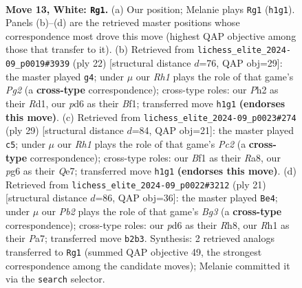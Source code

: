 \documentclass[11pt]{article}
\begin{document}
\clearpage

\begin{figure}[p]\centering
\begin{subfigure}{0.46\textwidth}\centering
\resizebox{\linewidth}{!}{%
\newchessgame
\chessboard[
  setfen={rnb1k2r/ppq1p1bp/3p2p1/4p1Pn/4P3/2N1BQ2/PPP2P1P/2KR1B1R w kq - 1 13},
  showmover=false,
  pgfstyle=straightmove, color=movearrow, markmove={h1-g1}
]}
\caption{}
\end{subfigure}\hfill
\begin{subfigure}{0.46\textwidth}\centering
\resizebox{\linewidth}{!}{%
\newchessgame
\chessboard[
  setfen={r1b1kb1r/2q2pp1/p1p2n2/1p2p2p/4P3/2N1BQ1P/PPP2PP1/2KR1BR1 w kq - 0 12},
  showmover=false,
  pgfstyle=straightmove, color=movearrow, markmove={g2-g4}
]}
\caption{}
\end{subfigure}
\\[4pt]
\begin{subfigure}{0.46\textwidth}\centering
\resizebox{\linewidth}{!}{%
\newchessgame
\chessboard[
  setfen={r4rk1/2pbqpb1/p4npp/1p2p3/4P3/1NP2Q1P/PPB2PP1/R1B1R1K1 b - - 3 15},
  showmover=false,
  pgfstyle=straightmove, color=movearrow, markmove={c7-c5}
]}
\caption{}
\end{subfigure}\hfill
\begin{subfigure}{0.46\textwidth}\centering
\resizebox{\linewidth}{!}{%
\newchessgame
\chessboard[
  setfen={2kr1b1r/ppp1pp1p/2n2pb1/3q4/3P2P1/2P2N1P/PP2QPB1/R1B1K2R b KQ - 2 11},
  showmover=false,
  pgfstyle=straightmove, color=movearrow, markmove={g6-e4}
]}
\caption{}
\end{subfigure}
\caption{\textbf{Move 13, White: \texttt{Rg1}.} (a) Our position; Melanie plays \texttt{Rg1} (\texttt{h1g1}). Panels (b)--(d) are the retrieved master positions whose correspondence most drove this move (highest QAP objective among those that transfer to it). (b) Retrieved from \texttt{lichess\_elite\_2024-09\_p0019\#3939} (ply 22) [structural distance $d$=76, QAP obj=29]: the master played \texttt{g4}; under $\mu$ our \emph{Rh1} plays the role of that game's \emph{Pg2} (a \textbf{cross-type} correspondence); cross-type roles: our \emph{P}h2 as their \emph{R}d1, our \emph{p}d6 as their \emph{B}f1; transferred move \texttt{h1g1} \textbf{(endorses this move)}. (c) Retrieved from \texttt{lichess\_elite\_2024-09\_p0023\#274} (ply 29) [structural distance $d$=84, QAP obj=21]: the master played \texttt{c5}; under $\mu$ our \emph{Rh1} plays the role of that game's \emph{Pc2} (a \textbf{cross-type} correspondence); cross-type roles: our \emph{B}f1 as their \emph{R}a8, our \emph{p}g6 as their \emph{Q}e7; transferred move \texttt{h1g1} \textbf{(endorses this move)}. (d) Retrieved from \texttt{lichess\_elite\_2024-09\_p0022\#3212} (ply 21) [structural distance $d$=86, QAP obj=36]: the master played \texttt{Be4}; under $\mu$ our \emph{Pb2} plays the role of that game's \emph{Bg3} (a \textbf{cross-type} correspondence); cross-type roles: our \emph{p}d6 as their \emph{R}h8, our \emph{R}h1 as their \emph{P}a7; transferred move \texttt{b2b3}. Synthesis: 2 retrieved analogs transferred to \texttt{Rg1} (summed QAP objective 49, the strongest correspondence among the candidate moves); Melanie committed it via the \texttt{search} selector.}

\end{figure}
\end{document}
